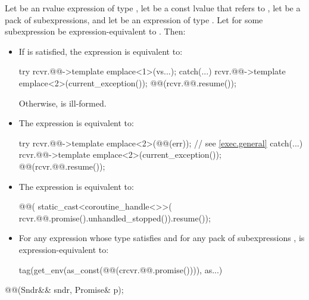 \pnum
Let  be an rvalue expression of type ,
let  be a const lvalue that refers to ,
let  be a pack of subexpressions, and
let  be an expression of type .
Let 
for some subexpression  be expression-equivalent to
.
Then:
\begin{itemize}
\item
If 
is satisfied,
the expression  is equivalent to:
\begin{codeblock}
try {
  rcvr.@@->template emplace<1>(vs...);
} catch(...) {
  rcvr.@@->template emplace<2>(current_exception());
}
@@(rcvr.@@.resume());
\end{codeblock}
Otherwise,  is ill-formed.
\item
The expression  is equivalent to:
\begin{codeblock}
try {
  rcvr.@@->template emplace<2>(@@(err));  // see \ref{exec.general}
} catch(...) {
  rcvr.@@->template emplace<2>(current_exception());
}
@@(rcvr.@@.resume());
\end{codeblock}
\item
The expression  is equivalent to:
\begin{codeblock}
@@(
  static_cast<coroutine_handle<>>(
    rcvr.@@.promise().unhandled_stopped()).resume());
\end{codeblock}
\item
For any expression 
whose type satisfies  and
for any pack of subexpressions ,
 is expression-equivalent to:
\begin{codeblock}
tag(get_env(as_const(@@(crcvr.@@.promise()))),
    as...)
\end{codeblock}
\end{itemize}

\begin{itemdecl}
@@(Sndr&& sndr, Promise& p);
\end{itemdecl}

